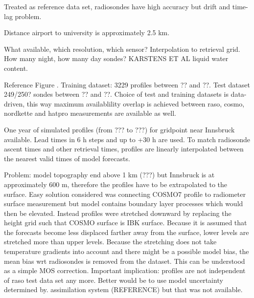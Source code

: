 \startsection[title=Radiosonde Climatology]

    Treated as reference data set, radiosondes have high accuracy but drift
    and time-lag problem. 

    Distance airport to university is approximately 2.5 km.

    What available, which resolution, which sensor? Interpolation to retrieval
    grid. How many night, how many day sondes? KARSTENS ET AL liquid water
    content.

    Reference Figure . Training dataset: 3229 profiles
    between ?? and ??. Test dataset 249/250? sondes between ?? and ??. Choice
    of test and training datasets is data-driven, this way maximum
    availablility overlap is achieved between raso, cosmo, nordkette and hatpro
    measurements are available as well.


            {}

\stopsection


\startsection[title=COSMO7 Simulated Radiosoundings]

    One year of simulated profiles (from ??? to ???) for gridpoint near
    Innsbruck available. Lead times in 6 h steps and up to +30 h are used. To
    match radiosonde ascent times and other retrieval times, profiles are
    linearly interpolated between the nearest valid times of model forecasts.

    Problem: model topography end above 1 km (???) but Innsbruck is at
    approximately 600 m, therefore the profiles have to be extrapolated to the
    surface. Easy solution considered was connecting COSMO7 profile to
    radiometer surface measurement but model contains boundary layer processes
    which would then be elevated. Instead profiles were stretched downward by
    replacing the height grid such that COSMO surface is IBK surface. Because
    it is assumed that the forecasts become less displaced farther away from
    the surface, lower levels are stretched more than upper levels. Because
    the stretching does not take temperature gradients into account and there
    might be a possible model bias, the mean bias wrt radiosondes is removed
    from the dataset. This can be understood as a simple MOS correction.
    Important implication: profiles are not independent of raso test data set
    any more. Better would be to use model uncertainty determined by.
    assimilation system (REFERENCE) but that was not available.

